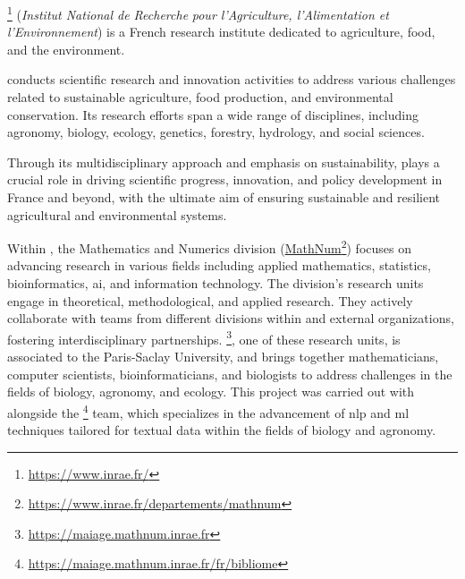 \label{01_2_background_and_motivation}

\label{01_2_1_INRAE}

\href{https://www.inrae.fr/}{\INRAE{} }\footnote{\url{https://www.inrae.fr/}}  (\emph{Institut National de Recherche} \emph{pour l'Agriculture, l'Alimentation et l'Environnement}) is a French research institute dedicated to agriculture, food, and the environment. 

\INRAE{} conducts scientific research and innovation activities to address various challenges related to sustainable agriculture, food production, and environmental conservation. Its research efforts span a wide range of disciplines, including agronomy, biology, ecology, genetics, forestry, hydrology, and social sciences.

Through its multidisciplinary approach and emphasis on sustainability, \INRAE{} plays a crucial role in driving scientific progress, innovation, and policy development in France and beyond, with the ultimate aim of ensuring sustainable and resilient agricultural and environmental systems.

Within \INRAE{}, the Mathematics and Numerics division (\href{https://www.inrae.fr/departements/mathnum}{MathNum}\footnote{\url{https://www.inrae.fr/departements/mathnum}}) focuses on advancing research in various fields including applied mathematics, statistics, bioinformatics, \gls{ai}, and information technology. The division's research units engage in theoretical, methodological, and applied research. They actively collaborate with teams from different divisions within \INRAE{} and external organizations, fostering interdisciplinary partnerships. \href{https://maiage.mathnum.inrae.fr}{\MAIAGE{}}\footnote{\url{https://maiage.mathnum.inrae.fr}}, one of these research units, is associated to the Paris-Saclay University, and brings together mathematicians, computer scientists, bioinformaticians, and biologists to address challenges in the fields of biology, agronomy, and ecology. This project was carried out with alongside the  \href{https://maiage.mathnum.inrae.fr/fr/bibliome}{\bibliome{}}\footnote{\url{https://maiage.mathnum.inrae.fr/fr/bibliome}} team, which specializes in the advancement of \gls{nlp} and \gls{ml} techniques tailored for textual data within the fields of biology and agronomy.  

